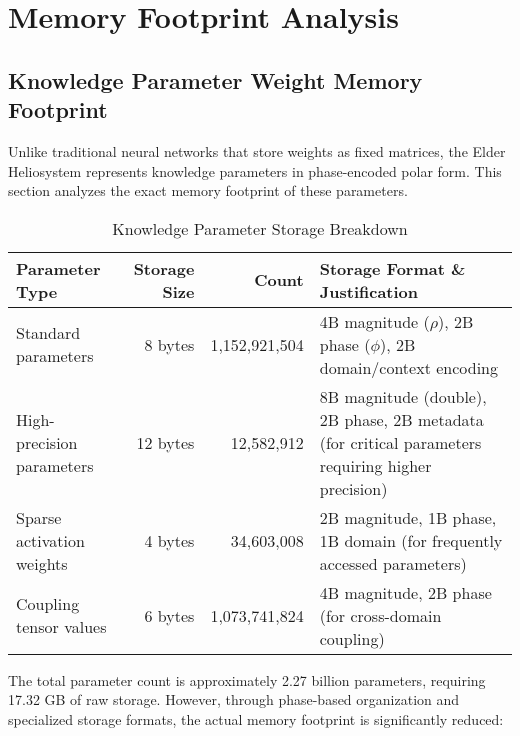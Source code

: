 \section{Memory Footprint Analysis}

\subsection{Knowledge Parameter Weight Memory Footprint}

Unlike traditional neural networks that store weights as fixed matrices, the Elder Heliosystem represents knowledge parameters in phase-encoded polar form. This section analyzes the exact memory footprint of these parameters.

\begin{table}[h]
\centering
\small
\begin{tabular}{|l|r|r|p{6cm}|}
\hline
\textbf{Parameter Type} & \textbf{Storage Size} & \textbf{Count} & \textbf{Storage Format \& Justification} \\
\hline
Standard parameters & 8 bytes & 1,152,921,504 & 4B magnitude ($\rho$), 2B phase ($\phi$), 2B domain/context encoding \\
\hline
High-precision parameters & 12 bytes & 12,582,912 & 8B magnitude (double), 2B phase, 2B metadata (for critical parameters requiring higher precision) \\
\hline
Sparse activation weights & 4 bytes & 34,603,008 & 2B magnitude, 1B phase, 1B domain (for frequently accessed parameters) \\
\hline
Coupling tensor values & 6 bytes & 1,073,741,824 & 4B magnitude, 2B phase (for cross-domain coupling) \\
\hline
\end{tabular}
\caption{Knowledge Parameter Storage Breakdown}
\end{table}

The total parameter count is approximately 2.27 billion parameters, requiring 17.32 GB of raw storage. However, through phase-based organization and specialized storage formats, the actual memory footprint is significantly reduced:

